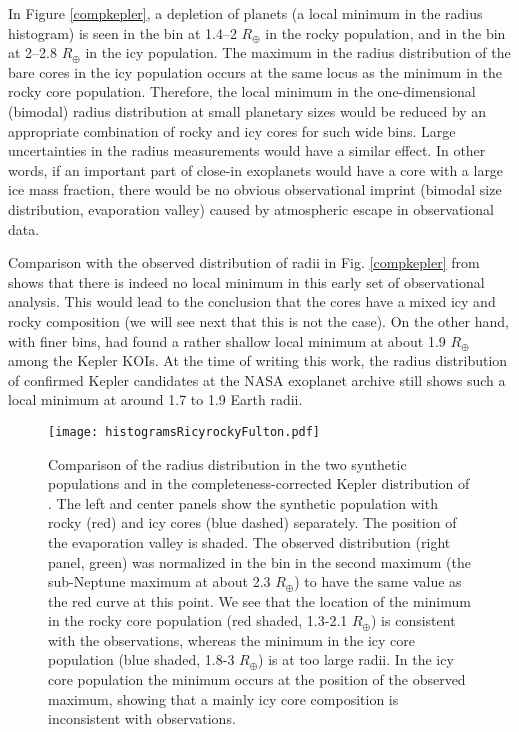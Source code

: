 \documentclass[]{emulateapj}
\def\rearth{R_{\oplus}}
\begin{document}
In Figure \ref{compkepler}, a depletion of planets (a local minimum in the radius histogram) is seen in the bin at 1.4--2 $R_{\oplus}$ in the rocky population, and in the bin at 2--2.8 $R_{\oplus}$ in the icy population. The maximum in the radius distribution of the bare cores in the icy population occurs at the same locus as the minimum in the rocky core population. Therefore, the local minimum in the one-dimensional (bimodal) radius distribution at small planetary sizes \citep{Owen2013,Jin2014} would be reduced by an appropriate combination of rocky and icy cores for such wide bins. Large uncertainties in the radius measurements would have a similar effect. In other words, if an important part of close-in exoplanets would have a core with a large ice mass fraction, there would be no obvious observational imprint (bimodal size distribution, evaporation valley) caused by atmospheric escape in observational data. 

Comparison with the observed distribution of radii in Fig. \ref{compkepler} from \citet{Petigura2013}  shows that there is indeed no local minimum in this early set of observational analysis. This would lead to the conclusion that the cores have a mixed icy and rocky composition (we will see next that this is not the case). On the other hand, with finer bins, \citet{Owen2013} had found a rather shallow local minimum at about 1.9 $\rearth$ among the Kepler KOIs. At the time of writing this work, the radius distribution of confirmed Kepler candidates at the NASA exoplanet archive still shows such a local minimum at around 1.7 to 1.9 Earth radii. 

\begin{figure*}
 \texttt{[image: histogramsRicyrockyFulton.pdf]}
 \caption{Comparison of the radius distribution in the two synthetic populations and in the completeness-corrected Kepler distribution of \citet{Fulton2017}. The left and center panels show the synthetic population with rocky (red) and icy cores (blue dashed) separately. The position of the evaporation valley is shaded. The observed distribution (right panel, green) was normalized in the bin in the second maximum (the sub-Neptune maximum at about 2.3 $R_\oplus$) to have the same value as the red curve at this point. We see that the location of the minimum in the rocky core population (red shaded, 1.3-2.1 $R_\oplus$) is consistent with the observations, whereas the minimum in the icy core population (blue shaded, 1.8-3  $R_\oplus$) is at too large radii. In the icy core population the minimum occurs at the position of the observed maximum, showing that a mainly icy core composition is inconsistent with observations. }
  \label{compkeplernew}
\end{figure*}
\end{document}
